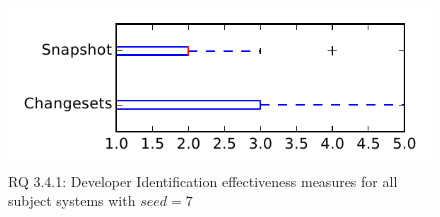 
\begin{figure}
\centering
\includegraphics[height=0.4\textheight]{figures/dit_seed/rq1_tiny_7}
\caption{RQ 3.4.1: Developer Identification effectiveness measures for all subject systems with $seed=7$}
\label{fig:dit_seed:rq1:tiny}
\end{figure}
